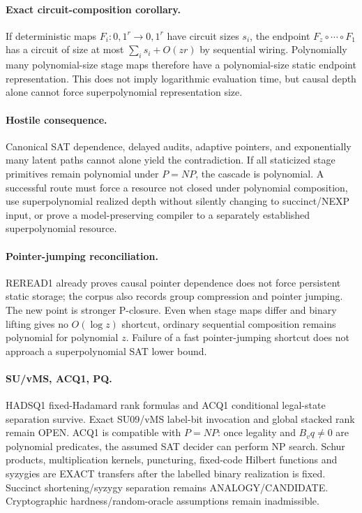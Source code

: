 \documentclass[11pt]{article}
\begin{document}
\paragraph{Exact circuit-composition corollary.} If deterministic maps \(F_i:{0,1}^r\to{0,1}^r\) have circuit sizes \(s_i\), the endpoint \(F_z\circ\cdots\circ F_1\) has a circuit of size at most \(\sum_i s_i+O(zr)\) by sequential wiring. Polynomially many polynomial-size stage maps therefore have a polynomial-size static endpoint representation. This does not imply logarithmic evaluation time, but causal depth alone cannot force superpolynomial representation size.
\paragraph{Hostile consequence.} Canonical SAT dependence, delayed audits, adaptive pointers, and exponentially many latent paths cannot alone yield the contradiction. If all staticized stage primitives remain polynomial under \(P=NP\), the cascade is polynomial. A successful route must force a resource not closed under polynomial composition, use superpolynomial realized depth without silently changing to succinct/NEXP input, or prove a model-preserving compiler to a separately established superpolynomial resource.
\paragraph{Pointer-jumping reconciliation.} REREAD1 already proves causal pointer dependence does not force persistent static storage; the corpus also records group compression and pointer jumping. The new point is stronger P-closure. Even when stage maps differ and binary lifting gives no \(O(\log z)\) shortcut, ordinary sequential composition remains polynomial for polynomial \(z\). Failure of a fast pointer-jumping shortcut does not approach a superpolynomial SAT lower bound.
\paragraph{SU/vMS, ACQ1, PQ.} HADSQ1 fixed-Hadamard rank formulas and ACQ1 conditional legal-state separation survive. Exact SU09/vMS label-bit invocation and global stacked rank remain OPEN. ACQ1 is compatible with \(P=NP\): once legality and \(B_vq\neq0\) are polynomial predicates, the assumed SAT decider can perform NP search. Schur products, multiplication kernels, puncturing, fixed-code Hilbert functions and syzygies are EXACT transfers after the labelled binary realization is fixed. Succinct shortening/syzygy separation remains ANALOGY/CANDIDATE. Cryptographic hardness/random-oracle assumptions remain inadmissible.
\end{document}
